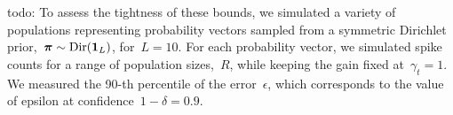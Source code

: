 todo: To assess the tightness of these bounds, we simulated a variety of 
populations representing probability vectors sampled from a symmetric
Dirichlet prior,~$\boldsymbol{\pi} \sim \mathrm{Dir}(\boldsymbol{1}_L)$, for~$L=10$. For each 
probability vector, we simulated spike counts for a range of 
population sizes,~$R$, while keeping the gain fixed at~$\gamma_t=1$.
We measured the 90-th percentile of the error~$\epsilon$, which 
corresponds to the value of epsilon at confidence~$1-\delta=0.9$.



 
\begin{comment}
\subsection{Neural dynamics that perform inference}

We show how a hippocampal circuit could perform approximate inference using 
simple neural update rules. 

Plugging Eq.~\ref{eq:pr_rep} into Eq.~\ref{eq:inf_calc}, our update rule should set,
\begin{align}
  \label{eq:pop_update}
  M_{t,\ell} 
  &\propto o_{t,\ell} \sum_{\ell'=1}^L A_{\ell, \ell'} \, M_{t-1, \ell'}
  = o_{t, \ell} \sum_{\ell'=1}^L \sum_{r'=1}^R A_{\ell, \ell'} \, s_{t-1, \ell', r'}
\end{align}


It is straightforward to design a stochastic update rule that 
implements this inference computation in expectation. 
For each neuron~$(\ell,r)$, in parallel, sample its state according to,
\begin{align}
  s_{t,\ell,r} &\sim \distPoisson (\lambda_{t, \ell, r}) \\
  \label{eq:rates}
    \lambda_{t, \ell, r} &= 
    \gamma_t \, o_{t,\ell} \sum_{\ell'=1}^L \sum_{r'=1}^R A_{\ell, \ell'} \cdot s_{t-1,\ell',r'},
\end{align}
where~$\gamma_t$ is a tunable gain parameter. In expectation,
\begin{align}
  \bbE[M_{t, \ell}] = \sum_{r=1}^R \lambda_{t, \ell, r}
  = R \, \gamma_t \, o_{t,\ell} \sum_{\ell'=1}^L \sum_{r'=1}^R A_{\ell, \ell'} \cdot s_{t-1,\ell',r'}
  \propto o_{t,\ell} \sum_{\ell'=1}^L A_{\ell, \ell'} \, M_{t-1, \ell'},
\end{align}
as required by Eq.~\ref{eq:pop_update}. As we will show below, the
expectation of~$\widehat{\pi}_{t,\ell}$, it is also true that,
\begin{align}
  \bbE[\widehat{\pi}_{t,\ell}] &= \frac{o_{t,\ell} \sum_{\ell'=1}^L A_{\ell, \ell'} \, M_{t-1, \ell'}}{\sum_{j} o_{t,j} \sum_{\ell'=1}^L A_{j, \ell'} \, M_{t-1, \ell'}}.
\end{align}


\end{comment}
